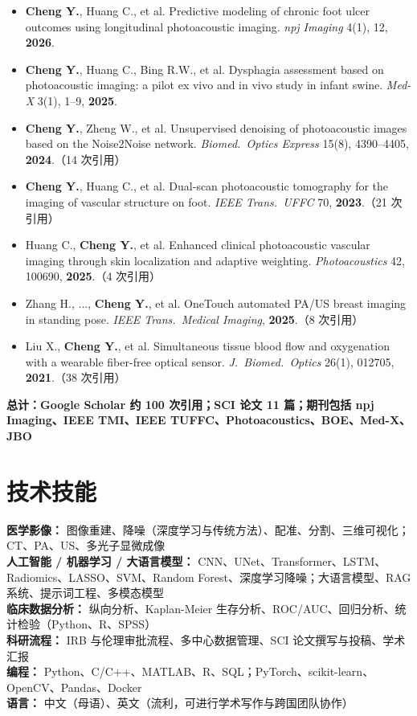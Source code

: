 \documentclass[letterpaper,10pt]{article}
\begin{document}
\begin{itemize}[leftmargin=0.2in, itemsep=1pt]
  \item \small \textbf{Cheng Y.}, Huang C., et al. Predictive modeling of chronic foot ulcer outcomes using longitudinal photoacoustic imaging. \textit{npj Imaging} 4(1), 12, \textbf{2026}.
  \item \small \textbf{Cheng Y.}, Huang C., Bing R.W., et al. Dysphagia assessment based on photoacoustic imaging: a pilot ex vivo and in vivo study in infant swine. \textit{Med-X} 3(1), 1--9, \textbf{2025}.
  \item \small \textbf{Cheng Y.}, Zheng W., et al. Unsupervised denoising of photoacoustic images based on the Noise2Noise network. \textit{Biomed.\ Optics Express} 15(8), 4390--4405, \textbf{2024}.\quad（14 次引用）
  \item \small \textbf{Cheng Y.}, Huang C., et al. Dual-scan photoacoustic tomography for the imaging of vascular structure on foot. \textit{IEEE Trans.\ UFFC} 70, \textbf{2023}.\quad（21 次引用）
  \item \small Huang C., \textbf{Cheng Y.}, et al. Enhanced clinical photoacoustic vascular imaging through skin localization and adaptive weighting. \textit{Photoacoustics} 42, 100690, \textbf{2025}.\quad（4 次引用）
  \item \small Zhang H., ..., \textbf{Cheng Y.}, et al. OneTouch automated PA/US breast imaging in standing pose. \textit{IEEE Trans.\ Medical Imaging}, \textbf{2025}.\quad（8 次引用）
  \item \small Liu X., \textbf{Cheng Y.}, et al. Simultaneous tissue blood flow and oxygenation with a wearable fiber-free optical sensor. \textit{J.\ Biomed.\ Optics} 26(1), 012705, \textbf{2021}.\quad（38 次引用）
\end{itemize}
\vspace{2pt}
\noindent\small\textbf{总计：Google Scholar 约 100 次引用；SCI 论文 11 篇；期刊包括 npj Imaging、IEEE TMI、IEEE TUFFC、Photoacoustics、BOE、Med-X、JBO}

\vspace{-2pt}

\section{技术技能}
\noindent
\small
\textbf{医学影像：} 图像重建、降噪（深度学习与传统方法）、配准、分割、三维可视化；CT、PA、US、多光子显微成像 \\
\textbf{人工智能 / 机器学习 / 大语言模型：} CNN、UNet、Transformer、LSTM、Radiomics、LASSO、SVM、Random Forest、深度学习降噪；大语言模型、RAG 系统、提示词工程、多模态模型 \\
\textbf{临床数据分析：} 纵向分析、Kaplan-Meier 生存分析、ROC/AUC、回归分析、统计检验（Python、R、SPSS） \\
\textbf{科研流程：} IRB 与伦理审批流程、多中心数据管理、SCI 论文撰写与投稿、学术汇报 \\
\textbf{编程：} Python、C/C++、MATLAB、R、SQL；PyTorch、scikit-learn、OpenCV、Pandas、Docker \\
\textbf{语言：} 中文（母语）、英文（流利，可进行学术写作与跨国团队协作）
\end{document}
